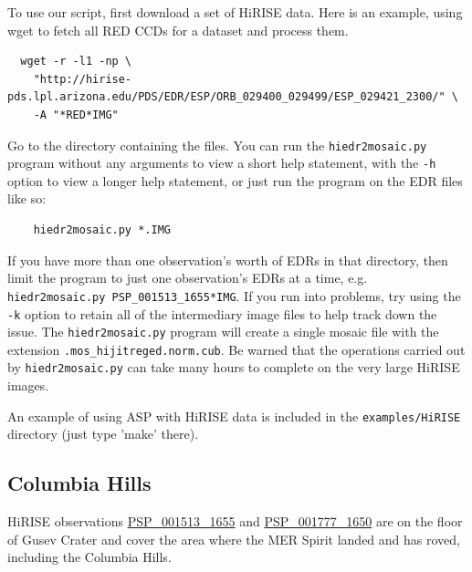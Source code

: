 To use our script, first download a set of HiRISE data. Here is
an example, using wget to fetch all RED CCDs for a dataset and
process them.

\begin{verbatim}
  wget -r -l1 -np \
    "http://hirise-pds.lpl.arizona.edu/PDS/EDR/ESP/ORB_029400_029499/ESP_029421_2300/" \
    -A "*RED*IMG"
\end{verbatim}

Go to the directory containing the files. You can run the
\texttt{hiedr2mosaic.py} program without any arguments to view a short
help statement, with the \texttt{-h} option to view a longer help statement,
or just run the program on the EDR files like so:

\begin{verbatim}
    hiedr2mosaic.py *.IMG
\end{verbatim}

If you have more than one observation's worth of EDRs in that
directory, then limit the program to just one observation's EDRs
at a time, e.g. \texttt{hiedr2mosaic.py PSP\_001513\_1655*IMG}.  If you
run into problems, try using the \texttt{-k} option to retain all of
the intermediary image files to help track down the issue.  The
\texttt{hiedr2mosaic.py} program will create a single mosaic file
with the extension \texttt{.mos\_hijitreged.norm.cub}.  Be warned that
the operations carried out by \texttt{hiedr2mosaic.py} can take many
hours to complete on the very large HiRISE images.

An example of using ASP with HiRISE data is included in the
\texttt{examples/HiRISE} directory (just type 'make' there).

\subsection{Columbia Hills}


\ac{HiRISE} observations
\href{http://hirise.lpl.arizona.edu/PSP_001513_1655}{PSP\_001513\_1655} and
\href{http://hirise.lpl.arizona.edu/PSP_001777_1650}{PSP\_001777\_1650}
are on the floor of Gusev Crater and cover the area where the \ac{MER}
Spirit landed and has roved, including the Columbia Hills.

